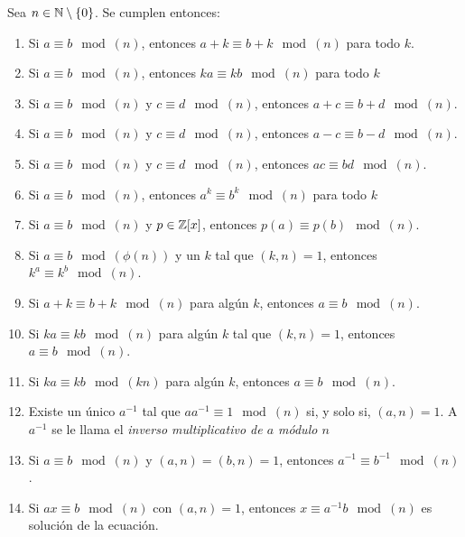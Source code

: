 \begin{proposicion}
	Sea $n \in \mathbb{N} \setminus \{0\}$. Se cumplen entonces:
	
	\begin{enumerate}
		\item Si $a \equiv b \mod(n)$, entonces $a + k \equiv b + k \mod(n)$ para todo $k$.
		
		\item Si $a \equiv b \mod(n)$, entonces $ka \equiv kb \mod(n)$ para todo $k$
		
		\item Si $a \equiv b \mod(n)$ y $c \equiv d \mod(n)$, entonces $a + c \equiv b + d \mod(n)$.
		
		\item Si $a \equiv b \mod(n)$ y $c \equiv d \mod(n)$, entonces $a - c \equiv b - d \mod(n)$.
		
		\item Si $a \equiv b \mod(n)$ y $c \equiv d \mod(n)$, entonces $ac \equiv bd \mod(n)$.
		
		\item Si $a \equiv b \mod(n)$, entonces $a^k \equiv b^k \mod(n)$ para todo $k$
		
		\item Si $a \equiv b \mod(n)$ y $p \in \mathbb{Z}[x]$, entonces $p(a) \equiv p(b) \mod(n)$.
		
		\item Si $a \equiv b \mod(\phi(n))$ y un $k$ tal que $(k, n) = 1$, entonces $k^a \equiv k^b \mod(n)$.
				
		\item Si $a + k \equiv b + k \mod(n)$ para algún $k$, entonces $a \equiv b \mod(n)$.
		
		\item Si $ka \equiv kb \mod(n)$ para algún $k$ tal que $(k, n) = 1$, entonces $a \equiv b \mod(n)$.
		
		\item Si $ka \equiv kb \mod(kn)$ para algún $k$, entonces $a \equiv b \mod(n)$.
		
		\item Existe un único $a^{-1}$ tal que $aa^{-1} \equiv 1 \mod(n)$ si, y solo si, $(a, n) = 1$. A $a^{-1}$ se le llama el \textit{inverso multiplicativo de $a$ módulo $n$}
		
		\item Si $a \equiv b \mod(n)$ y $(a, n) = (b, n) = 1$, entonces $a^{-1} \equiv b^{-1} \mod(n)$.
		
		\item Si $ax \equiv b \mod(n)$ con $(a, n) = 1$, entonces $x \equiv a^{-1}b \mod(n)$ es solución de la ecuación.
	\end{enumerate}
\end{proposicion}

